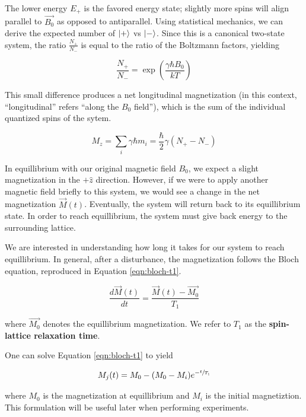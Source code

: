 \documentclass[
    floatfix,  %
    reprint,
    amsmath,amssymb,
    aps,
]{revtex4-2}
\DeclarePairedDelimiter\ket{\lvert}{\rangle}
\begin{document}
The lower energy $E_+$ is the favored energy state; slightly more spins will align parallel to $\vec{B_0}$ as opposed to antiparallel. Using statistical mechanics, we can derive the expected number of $\ket{+}$ vs $\ket{-}$. Since this is a canonical two-state system, the ratio $\frac{N_+}{N_-}$ is equal to the ratio of the Boltzmann factors, yielding

\begin{equation}
    \frac{N_+}{N_-} = \exp\left(\frac{\gamma \hbar B_0}{k T}\right)
\end{equation}

This small difference produces a net longitudinal magnetization (in this context, ``longitudinal'' refers ``along the $B_0$ field''), which is the sum of the individual quantized spins of the sytem. \cite{lab-manual}

\begin{equation}
    M_z = \sum_i \gamma \hbar m_i = \frac{\hbar}{2} \gamma (N_+ - N_-)
\end{equation}

In equillibrium with our original magnetic field $B_0$, we expect a slight magnetization in the $+\hat{z}$ direction. However, if we were to apply another magnetic field briefly to this system, we would see a change in the net magnetization $\vec{M}(t)$. Eventually, the system will return back to its equillibrium state. In order to reach equillibrium, the system must give back energy to the surrounding lattice.

We are interested in understanding how long it takes for our system to reach equillibrium. In general, after a disturbance, the magnetization follows the Bloch equation, reproduced in Equation \ref{eqn:bloch-t1}.

\begin{equation}\label{eqn:bloch-t1}
    \frac{d \vec{M}(t)}{dt} = \frac{\vec{M}(t)-\vec{M_0}}{T_1}
\end{equation}

where $\vec{M_0}$ denotes the equillibrium magnetization. We refer to $T_1$ as the \textbf{spin-lattice relaxation time}. \cite{principles-resonance}

One can solve Equation \ref{eqn:bloch-t1} to yield

\begin{equation}\label{eqn:decay-eqn}
    M_{j}(t) = M_0 - (M_0 - M_i)e^{-\sfrac{t}{T_1}}
\end{equation}

where $M_0$ is the magnetization at equillibrium and $M_i$ is the initial magnetiztion.\cite{principles-resonance} This formulation will be useful later when performing experiments.
\end{document}
